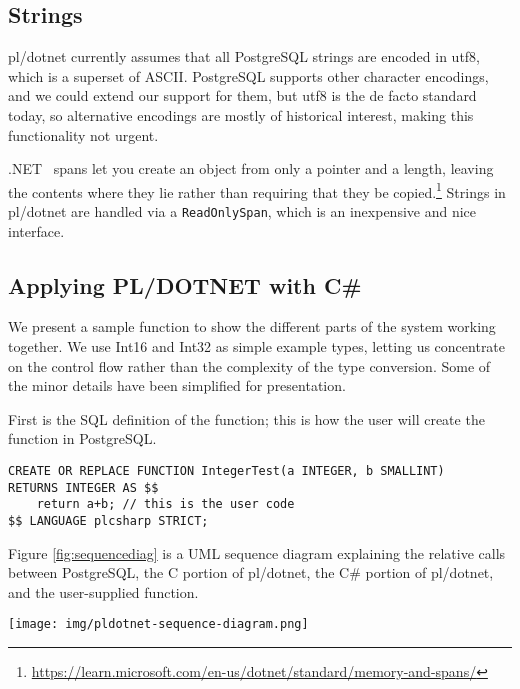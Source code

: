 \documentclass[sigconf,techreport,authorversion,nonacm]{acmart}
\newcommand{\dotnet}{.NET }
\begin{document}
\subsection{Strings}

pl/dotnet currently assumes that all PostgreSQL strings are encoded
in utf8, which is a superset of ASCII.  PostgreSQL supports other
character encodings, and we could extend our support for them, but
utf8 is the de facto standard today, so alternative encodings are
mostly of historical interest, making this functionality not urgent.

\dotnet\ spans let you create an object from only a pointer and a
length, leaving the contents where they lie rather than requiring
that they be copied.\footnote{\url{https://learn.microsoft.com/en-us/dotnet/standard/memory-and-spans/}}
Strings in pl/dotnet are handled via a \texttt{ReadOnlySpan}, which
is an inexpensive and nice interface.

\subsection{Applying PL/DOTNET with C\#}

We present a sample function to show the different parts of
the system working together.  We use Int16 and Int32 as simple
example types, letting us concentrate on the control flow
rather than the complexity of the type conversion.  Some of the
minor details have been simplified for presentation.

First is the SQL definition of the function; this is how the user
will create the function in PostgreSQL.

\begin{listing}[H]
\begin{verbatim}
CREATE OR REPLACE FUNCTION IntegerTest(a INTEGER, b SMALLINT)
RETURNS INTEGER AS $$
    return a+b; // this is the user code
$$ LANGUAGE plcsharp STRICT;
\end{verbatim}
\caption{How to define a function}
\end{listing}

Figure \ref{fig:sequencediag} is a UML sequence diagram explaining the relative
calls between PostgreSQL, the C portion of pl/dotnet, the C\# portion
of pl/dotnet, and the user-supplied function.

\begin{figure*}
        \texttt{[image: img/pldotnet-sequence-diagram.png]}
        \caption{Figure \thefigure: pl/csharp Sequence Diagram}
	\label{fig:sequencediag}
\end{figure*}
\end{document}
